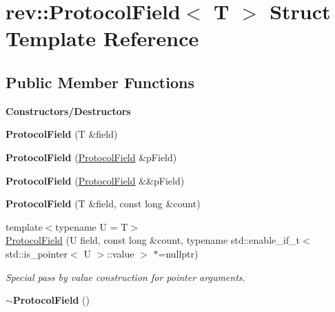 \hypertarget{structrev_1_1_protocol_field}{}\section{rev\+::Protocol\+Field$<$ T $>$ Struct Template Reference}
\label{structrev_1_1_protocol_field}
\subsection*{Public Member Functions}
\begin{Indent}\textbf{ Constructors/\+Destructors}\par
\begin{DoxyCompactItemize}
\item 
\mbox{\label{structrev_1_1_protocol_field_a436682a8f16f7e0f851668d2598c08eb}} 
{\bfseries Protocol\+Field} (T \&field)
\item 
\mbox{\label{structrev_1_1_protocol_field_a6b369ffa16782aa23ddc6ca6f5a39560}} 
{\bfseries Protocol\+Field} (\mbox{\hyperlink{structrev_1_1_protocol_field}{Protocol\+Field}} \&p\+Field)
\item 
\mbox{\label{structrev_1_1_protocol_field_a8182d223c939a67463e98fc988ac728f}} 
{\bfseries Protocol\+Field} (\mbox{\hyperlink{structrev_1_1_protocol_field}{Protocol\+Field}} \&\&p\+Field)
\item 
\mbox{\label{structrev_1_1_protocol_field_a6a0646261cf97050d02887254f19375f}} 
{\bfseries Protocol\+Field} (T \&field, const long \&count)
\item 
{\footnotesize template$<$typename U  = T$>$ }\\\mbox{\hyperlink{structrev_1_1_protocol_field_a06790796f00e203909e4134eb9a9a0a4}{Protocol\+Field}} (U field, const long \&count, typename std\+::enable\+\_\+if\+\_\+t$<$ std\+::is\+\_\+pointer$<$ U $>$\+::value $>$ $\ast$=nullptr)
\begin{DoxyCompactList}\small\item\em Special pass by value construction for pointer arguments. \end{DoxyCompactList}\item 
\mbox{\label{structrev_1_1_protocol_field_a8538c2d79254bb678a2b6d664a1f38d4}} 
{\bfseries $\sim$\+Protocol\+Field} ()
\end{DoxyCompactItemize}
\end{Indent}
